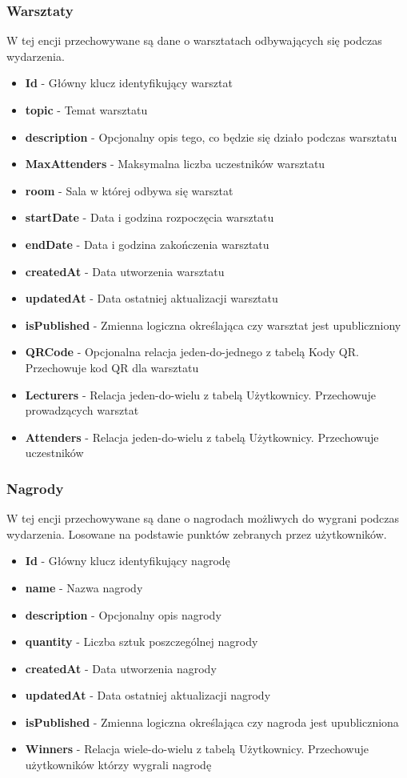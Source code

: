 \subsubsection{Warsztaty}
\noindent W tej encji przechowywane są dane o warsztatach odbywających się podczas wydarzenia.
\begin{itemize}
    \item \textbf{Id} - Główny klucz identyfikujący warsztat
    \item \textbf{topic} - Temat warsztatu
    \item \textbf{description} - Opcjonalny opis tego, co będzie się działo podczas warsztatu
    \item \textbf{MaxAttenders} - Maksymalna liczba uczestników warsztatu
    \item \textbf{room} - Sala w której odbywa się warsztat
    \item \textbf{startDate} - Data i godzina rozpoczęcia warsztatu
    \item  \textbf{endDate} - Data i godzina zakończenia warsztatu
    \item  \textbf{createdAt} - Data utworzenia warsztatu
    \item  \textbf{updatedAt} - Data ostatniej aktualizacji warsztatu
    \item  \textbf{isPublished} - Zmienna logiczna określająca czy warsztat jest upubliczniony
    \item   \textbf{QRCode} - Opcjonalna relacja jeden-do-jednego z tabelą Kody QR. Przechowuje kod QR dla warsztatu
    \item  \textbf{Lecturers} - Relacja jeden-do-wielu z tabelą Użytkownicy. Przechowuje prowadzących warsztat
    \item \textbf{Attenders} - Relacja jeden-do-wielu z tabelą Użytkownicy. Przechowuje uczestników
\end{itemize}
\subsubsection{Nagrody}
\noindent W tej encji przechowywane są dane o nagrodach możliwych do wygrani podczas wydarzenia. Losowane na podstawie punktów zebranych przez użytkowników.
\begin{itemize}
    \item \textbf{Id} - Główny klucz identyfikujący nagrodę
    \item \textbf{name} - Nazwa nagrody
    \item \textbf{description} - Opcjonalny opis nagrody
    \item \textbf{quantity} - Liczba sztuk poszczególnej nagrody
    \item \textbf{createdAt} - Data utworzenia nagrody
    \item \textbf{updatedAt} - Data ostatniej aktualizacji nagrody
    \item \textbf{isPublished} - Zmienna logiczna określająca czy nagroda jest upubliczniona
    \item \textbf{Winners} - Relacja wiele-do-wielu z tabelą Użytkownicy. Przechowuje użytkowników którzy wygrali nagrodę
    \end{itemize}
